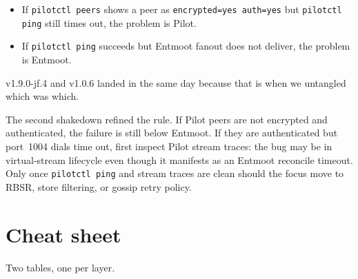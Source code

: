 \documentclass[11pt,a4paper]{article}
\begin{document}
\begin{itemize}[leftmargin=1.2em]
    \item If \texttt{pilotctl peers} shows a peer as
    \texttt{encrypted=yes auth=yes} but \texttt{pilotctl ping}
    still times out, the problem is Pilot.
    \item If \texttt{pilotctl ping} succeeds but Entmoot fanout
    does not deliver, the problem is Entmoot.
\end{itemize}

v1.9.0-jf.4 and v1.0.6 landed in the same day because that is
when we untangled which was which.

The second shakedown refined the rule. If Pilot peers are not
encrypted and authenticated, the failure is still below Entmoot. If
they are authenticated but port~1004 dials time out, first inspect
Pilot stream traces: the bug may be in virtual-stream lifecycle even
though it manifests as an Entmoot reconcile timeout. Only once
\texttt{pilotctl ping} and stream traces are clean should the focus
move to RBSR, store filtering, or gossip retry policy.

\section{Cheat sheet}
\label{sec:cheat}

Two tables, one per layer.
\end{document}
